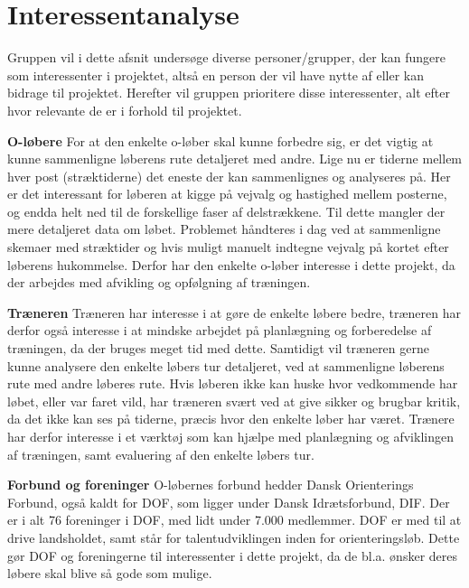\section{Interessentanalyse}
Gruppen vil i dette afsnit undersøge diverse personer/grupper, der kan fungere som interessenter i projektet, altså en person der vil have nytte af eller kan bidrage til projektet. Herefter vil gruppen prioritere disse interessenter, alt efter hvor relevante de er i forhold til projektet.  

\textbf{O-løbere} \newline
For at den enkelte o-løber skal kunne forbedre sig, er det vigtig at kunne sammenligne løberens rute detaljeret med andre. Lige nu er tiderne mellem hver post (stræktiderne) det eneste der kan sammenlignes og analyseres på. Her er det interessant for løberen at kigge på vejvalg og hastighed mellem posterne, og endda helt ned til de forskellige faser af delstrækkene. Til dette mangler der mere detaljeret data om løbet. Problemet håndteres i dag ved at sammenligne skemaer med stræktider og hvis muligt manuelt indtegne vejvalg på kortet efter løberens hukommelse. Derfor har den enkelte o-løber interesse i dette projekt, da der arbejdes med afvikling og opfølgning af træningen. 

\textbf{Træneren}\newline
Træneren har interesse i at gøre de enkelte løbere bedre, træneren har derfor også interesse i at mindske arbejdet på planlægning og forberedelse af træningen, da der bruges meget tid med dette. Samtidigt vil træneren gerne kunne analysere den enkelte løbers tur detaljeret, ved at sammenligne løberens rute med andre løberes rute. Hvis løberen ikke kan huske hvor vedkommende har løbet, eller var faret vild, har træneren svært ved at give sikker og brugbar kritik, da det ikke kan ses på tiderne, præcis hvor den enkelte løber har været. Trænere har derfor interesse i et værktøj som kan hjælpe med planlægning og afviklingen af træningen, samt evaluering af den enkelte løbers tur.

\textbf{Forbund og foreninger} \newline
O-løbernes forbund hedder Dansk Orienterings Forbund, også kaldt for DOF, som ligger under Dansk Idrætsforbund, DIF. Der er i alt 76 foreninger i DOF, med lidt under 7.000 medlemmer\citep{DIF}. DOF er med til at drive landsholdet, samt står for talentudviklingen inden for orienteringsløb. Dette gør DOF og foreningerne til interessenter i dette projekt, da de bl.a. ønsker deres løbere skal blive så gode som mulige. \citep{DIF}


